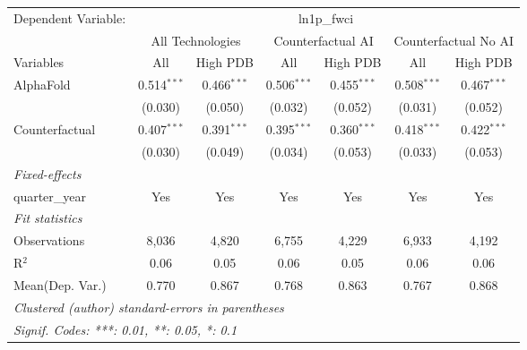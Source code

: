 \begingroup
\centering
\begin{tabular}{lcccccc}
   \tabularnewline \midrule \midrule
   Dependent Variable: & \multicolumn{6}{c}{ln1p\_fwci}\\
 & \multicolumn{2}{c}{All Technologies} & \multicolumn{2}{c}{Counterfactual AI} & \multicolumn{2}{c}{Counterfactual No AI} \\
\cmidrule(lr){1-1}\cmidrule(lr){2-3} \cmidrule(lr){4-5} \cmidrule(lr){6-7}
Variables & \multicolumn{1}{c}{All} & \multicolumn{1}{c}{High PDB} & \multicolumn{1}{c}{All} & \multicolumn{1}{c}{High PDB} & \multicolumn{1}{c}{All} & \multicolumn{1}{c}{High PDB} \\
\cmidrule(lr){1-1}\cmidrule(lr){2-2} \cmidrule(lr){3-3} \cmidrule(lr){4-4} \cmidrule(lr){5-5} \cmidrule(lr){6-6} \cmidrule(lr){7-7}
   AlphaFold      & 0.514$^{***}$ & 0.466$^{***}$ & 0.506$^{***}$ & 0.455$^{***}$ & 0.508$^{***}$ & 0.467$^{***}$\\   
                  & (0.030)       & (0.050)       & (0.032)       & (0.052)       & (0.031)       & (0.052)\\   
   Counterfactual & 0.407$^{***}$ & 0.391$^{***}$ & 0.395$^{***}$ & 0.360$^{***}$ & 0.418$^{***}$ & 0.422$^{***}$\\   
                  & (0.030)       & (0.049)       & (0.034)       & (0.053)       & (0.033)       & (0.053)\\   
   \midrule
   \emph{Fixed-effects}\\
   quarter\_year  & Yes           & Yes           & Yes           & Yes           & Yes           & Yes\\  
   \midrule
   \emph{Fit statistics}\\
   Observations   & 8,036         & 4,820         & 6,755         & 4,229         & 6,933         & 4,192\\  
   R$^2$          & 0.06          & 0.05          & 0.06          & 0.05          & 0.06          & 0.06\\  
Mean(Dep. Var.) & 0.770 & 0.867 & 0.768 & 0.863 & 0.767 & 0.868 \\
   \midrule \midrule
   \multicolumn{7}{l}{\emph{Clustered (author) standard-errors in parentheses}}\\
   \multicolumn{7}{l}{\emph{Signif. Codes: ***: 0.01, **: 0.05, *: 0.1}}\\
\end{tabular}
\par\endgroup
